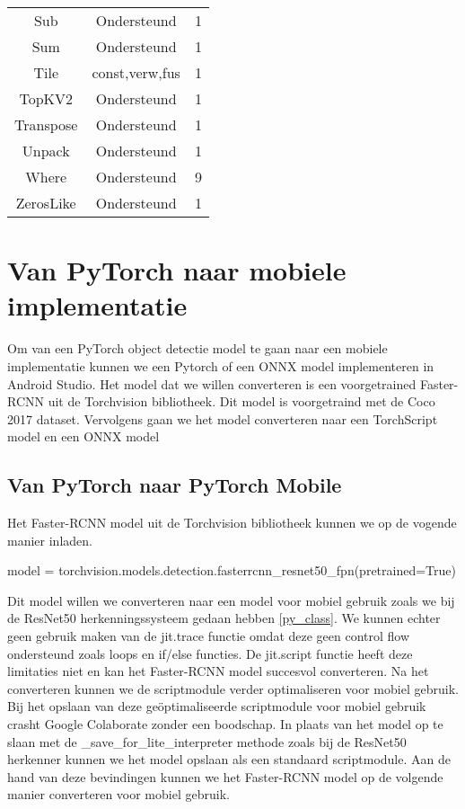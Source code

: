 \begin{table}[!ht]
\begin{tabular}{ccc}
    Sub & Ondersteund & 1 \\
    Sum & Ondersteund & 1 \\
    Tile & const,verw,fus & 1 \\
    TopKV2 & Ondersteund & 1 \\
    Transpose & Ondersteund & 1 \\
    Unpack & Ondersteund & 1 \\
    Where & Ondersteund & 9 \\
    ZerosLike & Ondersteund & 1 \\
    \hline
\end{tabular}
\label{tab:TF_det_op}
\end{table}

\section{Van PyTorch naar mobiele implementatie}
Om van een PyTorch object detectie model te gaan naar een mobiele implementatie kunnen we een Pytorch of een ONNX model implementeren in Android Studio.
Het model dat we willen converteren is een voorgetrained Faster-RCNN uit de Torchvision bibliotheek.
Dit model is voorgetraind met de Coco 2017 dataset.
Vervolgens gaan we het model converteren naar een TorchScript model en een ONNX model

\subsection{Van PyTorch naar PyTorch Mobile}
Het Faster-RCNN model uit de Torchvision bibliotheek kunnen we op de vogende manier inladen.

\begin{python}
model = torchvision.models.detection.fasterrcnn_resnet50_fpn(pretrained=True)
\end{python}

Dit model willen we converteren naar een model voor mobiel gebruik zoals we bij de ResNet50 herkenningssysteem gedaan hebben \ref{py_class}. 
We kunnen echter geen gebruik maken van de jit.trace functie omdat deze geen control flow ondersteund zoals loops en if/else functies.
De jit.script functie heeft deze limitaties niet en kan het Faster-RCNN model succesvol converteren.
Na het converteren kunnen we de scriptmodule verder optimaliseren voor mobiel gebruik.
Bij het opslaan van deze ge\"optimaliseerde scriptmodule voor mobiel gebruik crasht Google Colaborate zonder een boodschap.
In plaats van het model op te slaan met de \_save\_for\_lite\_interpreter methode zoals bij de ResNet50 herkenner kunnen we het model opslaan als een standaard scriptmodule.
Aan de hand van deze bevindingen kunnen we het Faster-RCNN model op de volgende manier converteren voor mobiel gebruik.

